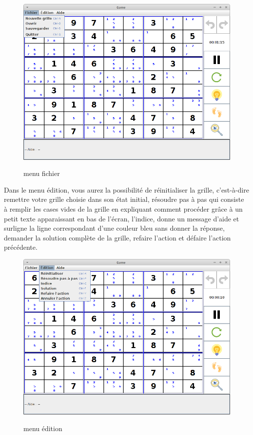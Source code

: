 \begin{figure}[ht]
  \caption{\label{annexe7} menu fichier}
  \includegraphics [width=130mm]{images/fichier.png} \\[0.5cm]
\end{figure}

\newpage
Dans le menu édition, vous aurez la possibilité de réinitialiser la grille, 
c'est-à-dire remettre votre grille choisie dans son état initial, 
résoudre pas à pas qui consiste à remplir les cases vides de la grille
en expliquant comment procéder grâce à un petit texte apparaissant en bas de l'écran, 
l'indice, donne un message d'aide et surligne la ligne correspondant d'une couleur bleu 
sans donner la réponse, demander la solution complète de la grille, 
refaire l'action et défaire l'action précédente.

\begin{figure}[ht]
  \caption{\label{annexe8} menu édition}
  \includegraphics [width=130mm]{images/edition.png} \\[0.5cm]
\end{figure}

